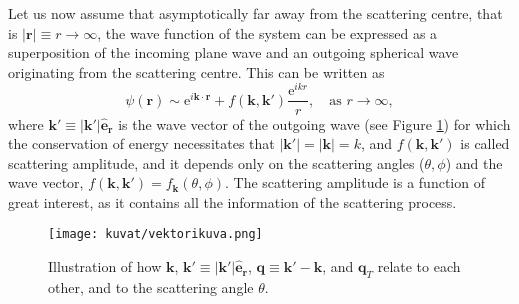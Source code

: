 \documentclass[a4paper, twoside, english, 12pt]{report}
\begin{document}
Let us now assume that asymptotically far away from the scattering centre, that is $|\mathbf{r}|\equiv r\rightarrow\infty$, the wave function of the system can be expressed as a superposition of the incoming plane wave and an outgoing spherical wave originating from the scattering centre. This can be written as
\begin{equation}\label{E:asymptotic_wave_function}		
	\psi(\mathbf{r}) \sim \text{e}^{i\mathbf{k}\cdot\mathbf{r}} + f(\mathbf{k},\mathbf{k'})\frac{\text{e}^{ikr}}{r}, \quad \text{as} \,\, r\rightarrow\infty,
\end{equation}
where $\mathbf{k'}\equiv |\mathbf{k'}|\mathbf{\hat{e}_r}$ is the wave vector of the outgoing wave (see Figure \ref{F:vectors}) for which the conservation of energy necessitates that $|\mathbf{k'}|=|\mathbf{k}|=k$, and $f(\mathbf{k},\mathbf{k'})$ is called scattering amplitude, and it depends only on the scattering angles ($\theta,\phi$) and the wave vector, $f(\mathbf{k},\mathbf{k'})=f_\mathbf{k}(\theta,\phi)$. The scattering amplitude is a function of great interest, as it contains all the information of the scattering process. 

\begin{figure}[htb!]
\centering
\texttt{[image: kuvat/vektorikuva.png]}	
\caption{Illustration of how $\mathbf{k}$, $\mathbf{k'}\equiv |\mathbf{k'}|\mathbf{\hat{e}_r}$, $\mathbf{q} \equiv \mathbf{k'}-\mathbf{k}$, and $\mathbf{q}_T$ relate to each other, and to the scattering angle $\theta$.}
\label{F:vectors}
\end{figure}
\end{document}
